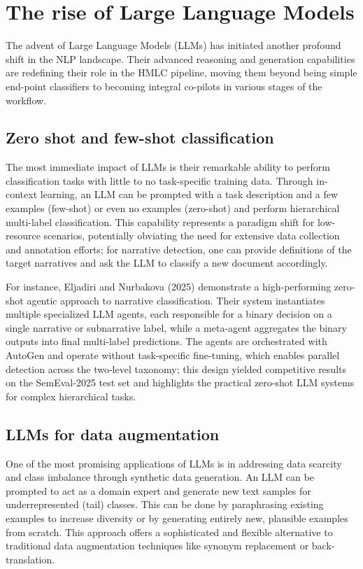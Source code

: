 \section{The rise of Large Language Models}

The advent of Large Language Models (LLMs) has initiated another profound shift in the NLP landscape. Their advanced reasoning and generation capabilities are redefining their role in the HMLC pipeline, moving them beyond being simple end-point classifiers to becoming integral co-pilots in various stages of the workflow.

\subsection{Zero shot and few-shot classification}
The most immediate impact of LLMs is their remarkable ability to perform classification tasks with little to no task-specific training data. Through in-context learning, an LLM can be prompted with a task description and a few examples (few-shot) or even no examples (zero-shot) and perform hierarchical multi-label classification. This capability represents a paradigm shift for low-resource scenarios, potentially obviating the need for extensive data collection and annotation efforts; for narrative detection, one can provide definitions of the target narratives and ask the LLM to classify a new document accordingly.~\cite{wang-etal-2023-text2topic}

For instance, Eljadiri and Nurbakova (2025) demonstrate a high-performing zero-shot agentic approach to narrative classification. Their system instantiates multiple specialized LLM agents, each responsible for a binary decision on a single narrative or subnarrative label, while a meta-agent aggregates the binary outputs into final multi-label predictions. The agents are orchestrated with AutoGen and operate without task-specific fine-tuning, which enables parallel detection across the two-level taxonomy; this design yielded competitive results on the SemEval-2025 test set and highlights the practical zero-shot LLM systems for complex hierarchical tasks.~\cite{eljadiri-nurbakova-2025-team}


\subsection{LLMs for data augmentation}
\label{sec:llm-augmentation}

One of the most promising applications of LLMs is in addressing data scarcity and class imbalance through synthetic data generation. An LLM can be prompted to act as a domain expert and generate new text samples for underrepresented (tail) classes. This can be done by paraphrasing existing examples to increase diversity or by generating entirely new, plausible examples from scratch. This approach offers a sophisticated and flexible alternative to traditional data augmentation techniques like synonym replacement or back-translation. \cite{cegin-etal-2025-llms,glazkova2024evaluating}

